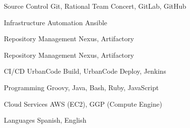 

\begin{cvskills}

  \cvskill
    {Source Control} %
    {Git, Rational Team Concert, GitLab, GitHub} %

  \cvskill
    {Infrastructure Automation} %
    {Ansible} %

  \cvskill
    {Repository Management} %
    {Nexus, Artifactory} %

\cvskill
{Repository Management} %
{Nexus, Artifactory} %

  \cvskill
    {CI/CD} %
    {UrbanCode Build, UrbanCode Deploy, Jenkins} %

  \cvskill
    {Programming} %
    {Groovy, Java, Bash, Ruby, JavaScript} %

  \cvskill
    {Cloud Services} %
    {AWS (EC2), GGP (Compute Engine)} %

  \cvskill
    {Languages} %
    {Spanish, English} %
\end{cvskills}
